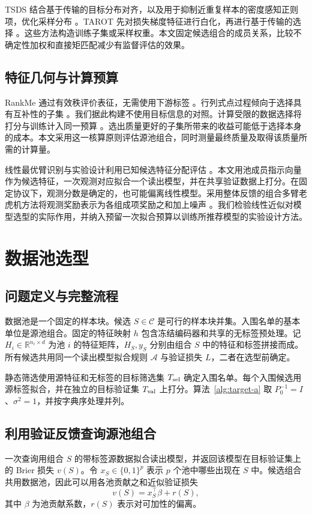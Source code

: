 \documentclass[UTF8,fontset=fandol,scheme=chinese,zihao=false,11pt,letterpaper]{ctexart}
\newcommand{\R}{\mathbb{R}}
\newcommand{\cC}{\mathcal{C}}
\begin{document}
TSDS 结合基于传输的目标分布对齐，以及用于抑制近重复样本的密度感知正则项，优化采样分布 \citep{liu2024tsds}。TAROT 先对损失梯度特征进行白化，再进行基于传输的选择 \citep{feng2025tarot}。这些方法构造训练子集或采样权重。本文固定候选组合的成员关系，比较不确定性加权和直接矩匹配减少有监督评估的效果。

\subsection{特征几何与计算预算}
RankMe 通过有效秩评价表征，无需使用下游标签 \citep{garrido2023rankme}。行列式点过程倾向于选择具有互补性的子集 \citep{kulesza2012}。我们据此构建不使用目标信息的对照。计算受限的数据选择将打分与训练计入同一预算 \citep{yin2025}。选出质量更好的子集所带来的收益可能低于选择本身的成本。本文采用这一核算原则评估源池组合，同时测量最终质量及取得该质量所需的计算量。

线性最优臂识别与实验设计利用已知候选特征分配评估 \citep{soare2014linbai,fiez2019transductive,xu2018lingape,yangtan2022linbai}。本文用池成员指示向量作为候选特征，一次观测对应拟合一个读出模型，并在共享验证数据上打分。在固定协议下，观测分数是确定的，也可能偏离线性模型。采用整体反馈的组合多臂老虎机方法将观测奖励表示为各组成项奖励之和加上噪声 \citep{rejwan2020full}。我们检验线性近似对模型选型的实际作用，并纳入预留一次拟合预算以训练所推荐模型的实验设计方法。

\section{数据池选型}
\label{sec:problem}
\label{sec:theory}
\subsection{问题定义与完整流程}
数据池是一个固定的样本块。候选 $S\in\cC$ 是可行的样本块并集。入围名单的基本单位是源池组合。固定的特征映射 $h$ 包含冻结编码器和共享的无标签预处理。记 $H_i\in\R^{n_i\times d}$ 为池 $i$ 的特征矩阵，$H_S,y_S$ 分别由组合 $S$ 中的特征和标签拼接而成。所有候选共用同一个读出模型拟合规则 $\mathcal A$ 与验证损失 $L$，二者在选型前确定。

静态筛选使用源特征和无标签的目标筛选集 $T_{\rm sel}$ 确定入围名单。每个入围候选用源标签拟合，并在独立的目标验证集 $T_{\rm val}$ 上打分。算法~\ref{alg:target-a} 取 $P_0^{-1}=I$、$\sigma^2=1$，并按字典序处理并列。

\subsection{利用验证反馈查询源池组合}
\label{sec:pool-query}
一次查询用组合 $S$ 的带标签源数据拟合读出模型，并返回该模型在目标验证集上的 Brier 损失 $v(S)$。令 $x_S\in\{0,1\}^p$ 表示 $p$ 个池中哪些出现在 $S$ 中。候选组合共用数据池，因此可以用各池贡献之和近似验证损失
\begin{equation}
 v(S)=x_S^\top\beta+r(S),
 \label{eq:pool-additive}
\end{equation}
其中 $\beta$ 为池贡献系数，$r(S)$ 表示对可加性的偏离。
\end{document}
